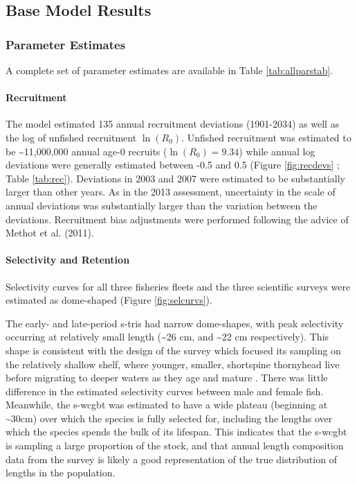 \documentclass[11pt,
  english,
  letterpaper,
]{article}
\begin{document}
\hypertarget{base-model-results}{%
\subsection{Base Model Results}\label{base-model-results}}

\hypertarget{parameter-estimates}{%
\subsubsection{Parameter Estimates}\label{parameter-estimates}}

A complete set of parameter estimates are available in Table \ref{tab:allparstab}.

\hypertarget{recruitment-1}{%
\paragraph{Recruitment}\label{recruitment-1}}

The model estimated 135 annual recruitment deviations (1901-2034) as well as the log of unfished recruitment \(\ln(R_0)\). Unfished recruitment was estimated to be \textasciitilde11,000,000 annual age-0 recruits (\(\ln(R_0) = 9.34\)) while annual log deviations were generally estimated between -0.5 and 0.5 (Figure \ref{fig:recdevs} ; Table \ref{tab:rec}). Deviations in 2003 and 2007 were estimated to be substantially larger than other years. As in the 2013 assessment, uncertainty in the scale of annual deviations was substantially larger than the variation between the deviations. Recruitment bias adjustments were performed following the advice of Methot et al. (2011).

\hypertarget{selectivity-and-retention-1}{%
\paragraph{Selectivity and Retention}\label{selectivity-and-retention-1}}

Selectivity curves for all three fisheries fleets and the three scientific surveys were estimated as dome-shaped (Figure \ref{fig:selcurvs}).

The early- and late-period \gls{s-tri}s had narrow dome-shapes, with peak selectivity occurring at relatively small length (\textasciitilde26 cm, and \textasciitilde22 cm respectively). This shape is consistent with the design of the survey which focused its sampling on the relatively shallow shelf, where younger, smaller, shortspine thornyhead live before migrating to deeper waters as they age and mature . There was little difference in the estimated selectivity curves between male and female fish. Meanwhile, the \gls{s-wcgbt} was estimated to have a wide plateau (beginning at \textasciitilde30cm) over which the species is fully selected for, including the lengths over which the species spends the bulk of its lifespan. This indicates that the \gls{s-wcgbt} is sampling a large proportion of the stock, and that annual length composition data from the survey is likely a good representation of the true distribution of lengths in the population.
\end{document}
